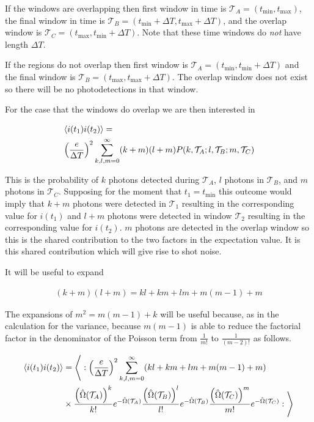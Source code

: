 \documentclass[12pt]{article}
\newcommand{\mc}[1]{\mathcal{#1}}
\begin{document}
If the windows are overlapping then first window in time is $\mc{T}_A = (t_{\text{min}}, t_{\text{max}})$, the final window in time is $\mc{T}_B = (t_{\text{min}}+\Delta T, t_{\text{max}}+\Delta T)$, and the overlap window is $\mc{T}_C = (t_{\text{max}},  t_{\text{min}}+\Delta T)$. Note that these time windows do \textit{not} have length $\Delta T$.

If the regions do not overlap then first window is $\mc{T}_A = (t_{\text{min}}, t_{\text{min}}+\Delta T)$ and the final window is $\mc{T}_B = (t_{\text{max}}, t_{\text{max}}+\Delta T)$. The overlap window does not exist so there will be no photodetections in that window.

For the case that the windows do overlap we are then interested in

\begin{align}
\label{twotime}
&\Braket{i(t_1)i(t_2)} =\\
&\left(\frac{e}{\Delta T}\right)^2 \sum_{k,l,m=0}^{\infty} (k+m)(l+m)P(k,\mc{T}_A;l,\mc{T}_B;m,\mc{T}_C)
\end{align}

This is the probability of $k$ photons detected during $\mc{T}_A$, $l$ photons in $\mc{T}_B$, and $m$ photons in $\mc{T}_C$. Supposing for the moment that $t_1 = t_{\text{min}}$ this outcome would imply that $k+m$ photons were detected in $\mc{T}_1$ resulting in the corresponding value for $i(t_1)$ and $l+m$ photons were detected in window $\mc{T}_2$ resulting in the corresponding value for $i(t_2)$. $m$ photons are detected in the overlap window so this is the shared contribution to the two factors in the expectation value. It is this shared contribution which will give rise to shot noise.

It will be useful to expand

\begin{align}
(k+m)(l+m) = kl + km + lm + m(m-1) + m
\end{align}

The expansions of $m^2 = m(m-1) + k$ will be useful because, as in the calculation for the variance, because $m(m-1)$ is able to reduce the factorial factor in the denominator of the Poisson term from $\frac{1}{m!}$ to $\frac{1}{(m-2)!}$ as follows.

\begin{align}
\Braket{i(t_1)i(t_2)} &= \Bigg \langle: \left(\frac{e}{\Delta T}\right)^2 \sum_{k,l,m=0}^{\infty} (kl + km + lm +m(m-1) + m)\\
&\times \frac{\left(\hat{\Omega}(\mc{T}_A)\right)^k}{k!}e^{-\hat{\Omega}(\mc{T}_A)} \frac{\left(\hat{\Omega}(\mc{T}_B)\right)^l}{l!}e^{-\hat{\Omega}(\mc{T}_B)} \frac{\left(\hat{\Omega}(\mc{T}_C)\right)^m}{m!}e^{-\hat{\Omega}(\mc{T}_C)} :\Bigg \rangle\\
\end{align}
\end{document}
